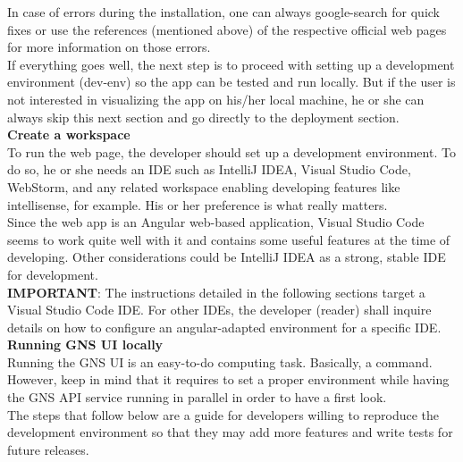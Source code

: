 In case of errors during the installation, one can always google-search for quick fixes or use the references (mentioned above) of the respective official web pages for more information on those errors.\\

If everything goes well, the next step is to proceed with setting up a development environment (dev-env) so the app can be tested and run locally. But if the user is not interested in visualizing the app on his/her local machine, he or she can always skip this next section and go directly to the deployment section.\\

\noindent
\textbf{Create a workspace }\\
To run the web page, the developer should set up a development environment. To do so, he or she needs an IDE such as IntelliJ IDEA, Visual Studio Code, WebStorm, and any related workspace enabling developing features like intellisense, for example. His or her preference is what really matters.\\

Since the web app is an Angular web-based application, Visual Studio Code seems to work quite well with it and contains some useful features at the time of developing. Other considerations could be IntelliJ IDEA as a strong, stable IDE for development.\\

\noindent
\textbf{IMPORTANT}: The instructions detailed in the following sections target a Visual Studio Code IDE. For other IDEs, the developer (reader) shall inquire details on how to configure an angular-adapted environment for a specific IDE.\\

\noindent
\textbf{Running GNS UI locally}\\
Running the GNS UI is an easy-to-do computing task. Basically, a command. However, keep in mind that it requires to set a proper environment while having the GNS API service running in parallel in order to have a first look.\\ 

The steps that follow below are a guide for developers willing to reproduce the development environment so that they may add more features and write tests for future releases.

